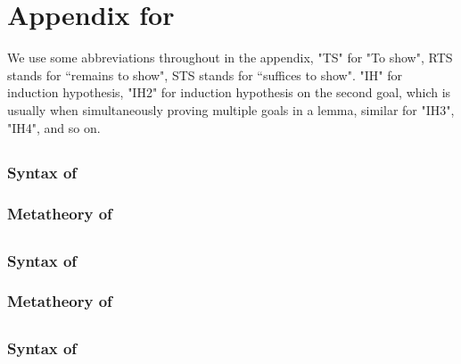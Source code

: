 \chapter{Appendix for {\BIAREL}}
\label{AppB}

We use some abbreviations throughout in the appendix, "TS" for "To show", RTS stands
for ``remains to show", STS stands for ``suffices to
show".  "IH" for induction hypothesis, "IH2" for induction hypothesis on the second goal, which is usually when simultaneously proving multiple goals in a lemma, similar for "IH3", "IH4", and so on.

\section{\relstlc}
\label{appendixb:relstlc}
 \subsection{Syntax of \relstlc}
 \label{appendixb:relstlc-syntax}
  
  \clearpage
  \subsection{Metatheory of \relstlc}
  \label{appendixb:relstlc_lemma}
  
  \clearpage

\section{\relref}
  \subsection{Syntax of \relref}
  \label{appendixb:relref_syntax}
  
  \clearpage
  \subsection{Metatheory of \relref}
   \label{appendixb:relref_lemma}
  
  \clearpage
  
  \section{\relinf}
\subsection{Syntax of \relinf}
 \label{appendixb:relinf_syntax}
   
  \clearpage
